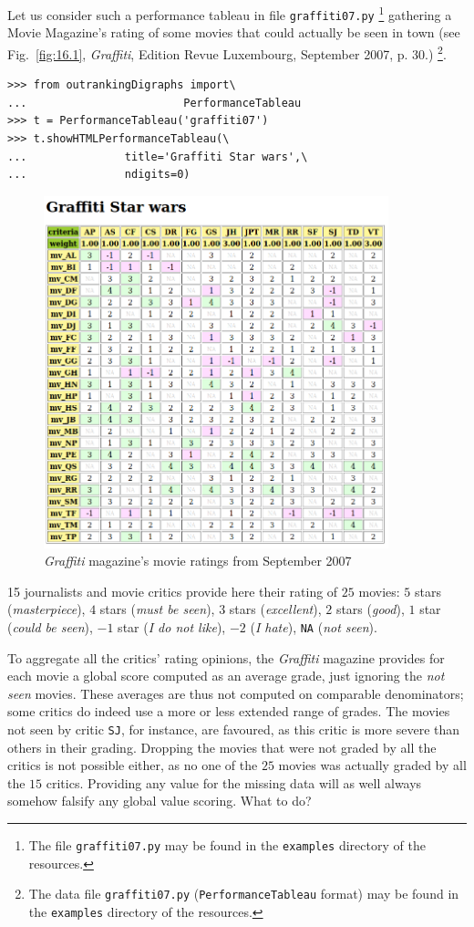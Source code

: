 Let us consider such a performance tableau in file \texttt{graffiti07.py} \footnote{The file \texttt{graffiti07.py} may be found in the \texttt{examples} directory of the \Digraph resources.} gathering a Movie Magazine's rating of some movies that could actually be seen in town (see Fig.~\vref{fig:16.1}, \emph{Graffiti}, Edition Revue Luxembourg, September 2007, p. 30.) \footnote{ The data file \texttt{graffiti07.py} (\texttt{PerformanceTableau} format) may be found in the \texttt{examples} directory of the \Digraph resources.}.
\begin{lstlisting}
>>> from outrankingDigraphs import\
...                        PerformanceTableau 
>>> t = PerformanceTableau('graffiti07')
>>> t.showHTMLPerformanceTableau(\
...               title='Graffiti Star wars',\
...               ndigits=0)
\end{lstlisting}
\begin{figure}[h]
\includegraphics[width=10cm]{Figures/graffiti07_1.png}
\caption{\emph{Graffiti} magazine's movie ratings from September 2007}
\label{fig:16.1}       %
\end{figure}
15 journalists and movie critics provide here their rating of $25$ movies: $5$ stars (\emph{masterpiece}), $4$ stars (\emph{must be seen}), $3$ stars (\emph{excellent}), $2$ stars (\emph{good}), $1$ star (\emph{could be seen}), $-1$ star (\emph{I do not like}), $-2$ (\emph{I hate}), \texttt{NA} (\emph{not seen}).

To aggregate all the critics' rating opinions, the \emph{Graffiti} magazine provides for each movie a global score computed as an average grade, just ignoring the \emph{not seen} movies. These averages are thus not computed on comparable denominators; some critics do indeed use a more or less extended range of grades. The movies not seen by critic \texttt{SJ}, for instance, are favoured, as this critic is more severe than others in their grading. Dropping the movies that were not graded by all the critics is not possible either, as no one of the $25$ movies was actually graded by all the $15$ critics. Providing any value for the missing data will as well always somehow falsify any global value scoring. What to do?

